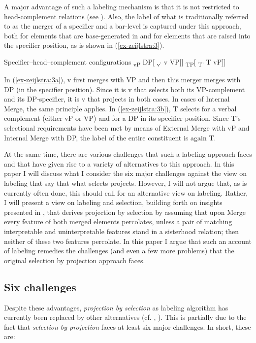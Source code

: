 \documentclass[output=paper
,modfonts
,nonflat]{langsci/langscibook}
\begin{document}
A major advantage of such a labeling mechanism is that it is not restricted to head-complement relations (see \citealt{Adger2003}). Also, the label of what is traditionally referred to as the merger of a specifier and a bar-level is captured under this approach, both for elements that are base-generated in and for elements that are raised into the specifier position, as is shown in (\ref{ex-zeijlstra:3}).

\begin{exe}
	\ex Specifier–head–complement configurations \label{ex-zeijlstra:3}
	\xlist
	\ex {[} \textsubscript{vP} DP{[} \textsubscript{v'} v VP{]}{]} \label{ex-zeijlstra:3a}
	\ex {[} \textsubscript{TP}{[} \textsubscript{T'} T vP{]}{]} \label{ex-zeijlstra:3b}
	\endxlist
\end{exe}
In (\ref{ex-zeijlstra:3a}), v first merges with VP and then this merger merges with DP (in the specifier position). Since it is v that selects both its VP-complement and its DP-specifier, it is v that projects in both cases. In cases of Internal Merge, the same principle applies. In (\ref{ex-zeijlstra:3b}), T selects for a verbal complement (either vP or VP) and for a DP in its specifier position. Since T’s selectional requirements have been met by means of External Merge with vP and Internal Merge with DP, the label of the entire constituent is again T.

At the same time, there are various challenges that such a labeling approach faces and that have given rise to a variety of alternatives to this approach. In this paper I will discuss what I consider the six major challenges against the view on labeling that say that what selects projects. However, I will not argue that, as is currently often done, this should call for an alternative view on labeling. Rather, I will present a view on labeling and selection, building forth on insights presented in \citet{Adger2003}, that derives projection by selection by assuming that upon Merge every feature of both merged elements percolates, unless a pair of matching interpretable and uninterpretable features stand in a sisterhood relation; then neither of these two features percolate. In this paper I argue that such an account of labeling remedies the challenges (and even a few more problems) that the original selection by projection approach faces.

\subsection{Six challenges} \label{sec-zeijlstra:1.2}
Despite these advantages, \textit{projection by selection} as labeling algorithm has currently been replaced by other alternatives (cf. \citealt{Collins2002}, \citealt{Chomsky2008, Chomsky2013, Chomsky2015}). This is partially due to the fact that \textit{selection by projection} faces at least six major challenges. In short, these are: 
\end{document}
